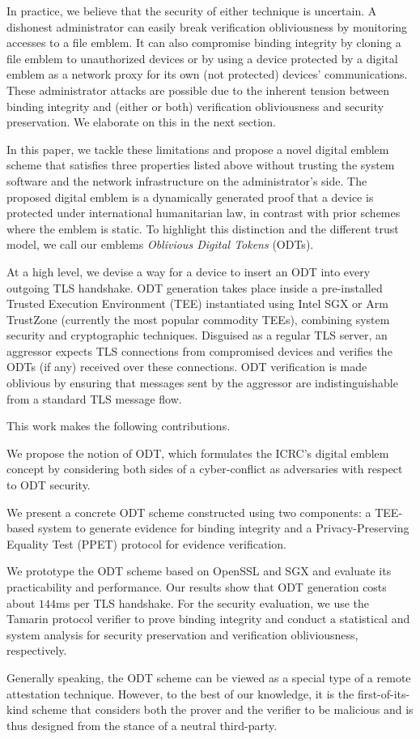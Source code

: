\documentclass[letterpaper,twocolumn,10pt]{article}
\begin{document}
In practice, we believe that the security of either technique is uncertain. A dishonest administrator can easily
break verification obliviousness by monitoring accesses to a file emblem. It can also compromise binding
integrity by cloning a file emblem to unauthorized devices or by using a device protected by a digital
emblem as a network proxy for its own (not protected) devices' communications. These administrator attacks
are possible due to the inherent tension between binding integrity and (either or both) verification obliviousness
and security preservation. We elaborate on this in the next section.

In this paper, we tackle these limitations and propose a novel digital emblem scheme that satisfies three
properties listed above without trusting the system software and the network infrastructure on the administrator's side.
The proposed digital emblem is a dynamically generated proof that a device is protected under international
humanitarian law, in contrast with prior schemes where the emblem is static. To highlight this distinction
and the different trust model, we call our emblems \emph{Oblivious Digital Tokens} (ODTs).

At a high level, we devise a way for a device to insert an ODT into every outgoing TLS handshake.
ODT generation takes place inside a pre-installed Trusted Execution Environment (TEE) instantiated
using Intel SGX or Arm TrustZone (currently the most popular commodity TEEs), combining system security
and cryptographic techniques. Disguised as a regular TLS server, an aggressor expects TLS connections
from compromised devices and verifies the ODTs (if any) received over these connections. ODT
verification is made oblivious by ensuring that messages sent by the aggressor are
indistinguishable from a standard TLS message flow.

This work makes the following contributions.
%
\begin{compactitem}
\item We propose the notion of ODT, which formulates the ICRC's digital emblem concept by considering both sides of a
cyber-conflict as adversaries with respect to ODT security.
%
\item We present a concrete ODT scheme constructed using two components: a TEE-based system to generate evidence
for binding integrity and a Privacy-Preserving Equality Test (PPET) protocol for evidence verification.
%
\item We prototype the ODT scheme based on OpenSSL and SGX and evaluate its practicability and performance.
Our results show that ODT generation costs about $144$ms per TLS handshake. For the security evaluation, we use
the Tamarin protocol verifier to prove binding integrity and conduct a statistical and system analysis for
security preservation and verification obliviousness, respectively.
%
\end{compactitem}
%
Generally speaking, the ODT scheme can be viewed as a special type of a remote attestation technique.
However, to the best of our knowledge, it is the first-of-its-kind scheme that considers both
the prover and the verifier to be malicious and is thus designed from the stance of a neutral third-party.
\end{document}

